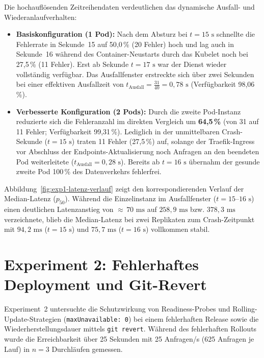 Die hochauflösenden Zeitreihendaten verdeutlichen das dynamische Ausfall- und Wiederanlaufverhalten:
\begin{itemize}[noitemsep,topsep=2pt]
    \item \textbf{Basiskonfiguration (1 Pod):} Nach dem Absturz bei $t = 15\text{ s}$ schnellte die Fehlerrate in Sekunde~15 auf 50{,}0\,\% (20 Fehler) hoch und lag auch in Sekunde~16 während des Container-Neustarts durch das Kubelet noch bei 27{,}5\,\% (11 Fehler). Erst ab Sekunde $t = 17\text{ s}$ war der Dienst wieder vollständig verfügbar. Das Ausfallfenster erstreckte sich über zwei Sekunden bei einer effektiven Ausfallzeit von $t_{\text{Ausfall}} = \frac{31}{40} = 0{,}78\text{ s}$ (Verfügbarkeit 98{,}06\,\%).
    \item \textbf{Verbesserte Konfiguration (2 Pods):} Durch die zweite Pod-Instanz reduzierte sich die Fehleranzahl im direkten Vergleich um \textbf{64,5\,\%} (von 31 auf 11 Fehler; Verfügbarkeit 99{,}31\,\%). Lediglich in der unmittelbaren Crash-Sekunde ($t = 15\text{ s}$) traten 11 Fehler (27{,}5\,\%) auf, solange der Traefik-Ingress vor Abschluss der Endpoints-Aktualisierung noch Anfragen an den beendeten Pod weiterleitete ($t_{\text{Ausfall}} = 0{,}28\text{ s}$). Bereits ab $t = 16\text{ s}$ übernahm der gesunde zweite Pod 100\,\% des Datenverkehrs fehlerfrei.
\end{itemize}

Abbildung~\ref{fig:exp1-latenz-verlauf} zeigt den korrespondierenden Verlauf der Median-Latenz ($p_{50}$). Während die Einzelinstanz im Ausfallfenster ($t = 15\text{--}16\text{ s}$) einen deutlichen Latenzanstieg von $\approx\,70\text{ ms}$ auf $258{,}9\text{ ms}$ bzw. $378{,}3\text{ ms}$ verzeichnete, blieb die Median-Latenz bei zwei Replikaten zum Crash-Zeitpunkt mit $94{,}2\text{ ms}$ ($t = 15\text{ s}$) und $75{,}7\text{ ms}$ ($t = 16\text{ s}$) vollkommen stabil.



\section{Experiment 2: Fehlerhaftes Deployment und Git-Revert}
\label{sec:ergebnis-exp2}
Experiment~2 untersuchte die Schutzwirkung von Readiness-Probes und Rolling-Update-Strategien (\texttt{maxUnavailable: 0}) bei einem fehlerhaften Release sowie die Wiederherstellungsdauer mittels \texttt{git revert}. Während des fehlerhaften Rollouts wurde die Erreichbarkeit über 25 Sekunden mit 25 Anfragen/s (625 Anfragen je Lauf) in $n=3$ Durchläufen gemessen.

